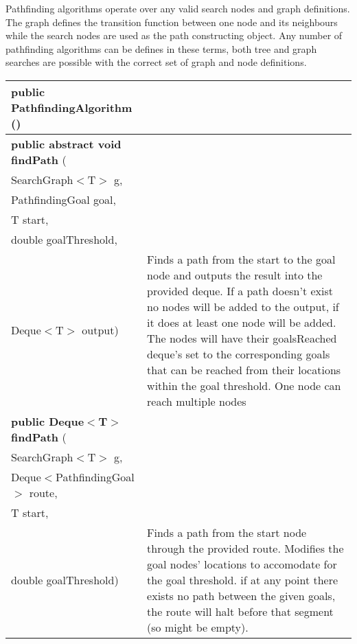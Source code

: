 { Pathfinding algorithms operate over any valid search nodes and graph definitions. The graph defines the transition function between one node and its neighbours while the search nodes are used as \newline%
 the path constructing object. Any number of pathfinding algorithms can be defines in these terms, both tree and graph searches are possible with the correct set of graph and node definitions.
 
\begin{tabular}{ p{3in}|m{3.4in}}
\textbf{public PathfindingAlgorithm} () & \\ \hline 
\textbf{public abstract void findPath } (\\ \hspace*{ 5pt} SearchGraph$<$T$>$ g,\\\hspace*{ 5pt} PathfindingGoal goal,\\\hspace*{ 5pt} T start,\\\hspace*{ 5pt} double goalThreshold,\\\hspace*{ 5pt} Deque$<$T$>$ output) & Finds a path from the start to the goal node and outputs the result into the provided deque.\newline%
 If a path doesn't exist no nodes will be added to the output, if it does at least one node will be added. The nodes will have their goalsReached deque's set\newline%
 to the corresponding goals that can be reached from their locations within the goal threshold. One node can reach multiple nodes\\ \hline 
\textbf{public Deque$<$T$>$ findPath } (\\ \hspace*{ 5pt} SearchGraph$<$T$>$ g,\\\hspace*{ 5pt} Deque$<$PathfindingGoal$>$ route,\\\hspace*{ 5pt} T start,\\\hspace*{ 5pt} double goalThreshold) & Finds a path from the start node through the provided route. Modifies the goal nodes' locations to accomodate for the goal threshold.\newline%
 if at any point there exists no path between the given goals, the route will halt before that segment (so might be empty).\\ \hline 

\end{tabular}}
